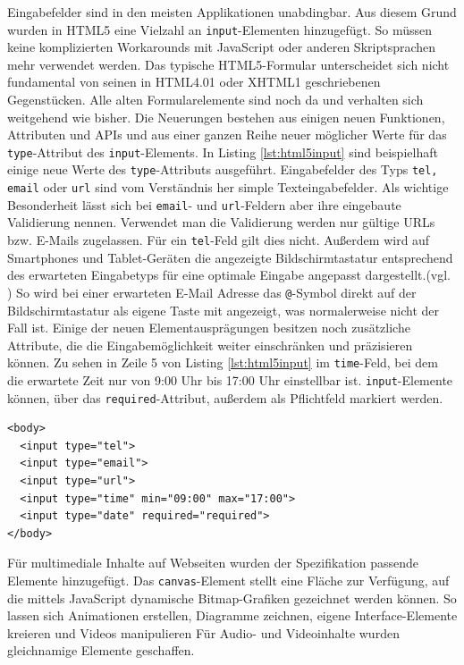Eingabefelder sind in den meisten Applikationen unabdingbar. Aus diesem Grund wurden in HTML5 eine Vielzahl an \texttt{input}-Elementen hinzugefügt. So müssen keine komplizierten Workarounds mit JavaScript oder anderen Skriptsprachen mehr verwendet werden. \glqq Das typische HTML5-Formular unterscheidet sich nicht fundamental von seinen in HTML4.01 oder XHTML1 geschriebenen Gegenstücken. Alle alten Formularelemente sind noch da und verhalten sich weitgehend wie bisher. Die Neuerungen bestehen aus einigen neuen Funktionen, Attributen und APIs und aus einer ganzen Reihe neuer möglicher Werte für das \texttt{type}-Attribut des \texttt{input}-Elements.\grqq{}\cite[S.176]{KronHTML2011} In Listing \ref{lst:html5input} sind beispielhaft einige neue Werte des \texttt{type}-Attributs ausgeführt. Eingabefelder des Typs \texttt{tel, email} oder \texttt{url} sind vom Verständnis her simple Texteingabefelder. Als wichtige Besonderheit lässt sich bei \texttt{email}- und \texttt{url}-Feldern aber ihre eingebaute Validierung nennen. Verwendet man die Validierung werden nur gültige URLs bzw. E-Mails zugelassen. Für ein \texttt{tel}-Feld gilt dies nicht. Außerdem wird auf Smartphones und Tablet-Geräten die angezeigte Bildschirmtastatur entsprechend des erwarteten Eingabetyps für eine optimale Eingabe angepasst dargestellt.(vgl. \cite[S.178]{KronHTML2011}) So wird bei einer erwarteten E-Mail Adresse das \texttt{@}-Symbol direkt auf der Bildschirmtastatur als eigene Taste mit angezeigt, was normalerweise nicht der Fall ist. Einige der neuen Elementausprägungen besitzen noch zusätzliche Attribute, die die Eingabemöglichkeit weiter einschränken und präzisieren können. Zu sehen in Zeile 5 von Listing \ref{lst:html5input} im \texttt{time}-Feld, bei dem die erwartete Zeit nur von 9:00 Uhr bis 17:00 Uhr einstellbar ist. \texttt{input}-Elemente können, über das \texttt{required}-Attribut, außerdem als Pflichtfeld markiert werden.

\vspace{1em}
\begin{lstlisting}[language=HTML5, caption=HTML5 \texttt{input}-Element, label=lst:html5input]
<body>
  <input type="tel">
  <input type="email">
  <input type="url">
  <input type="time" min="09:00" max="17:00">
  <input type="date" required="required">
</body>
\end{lstlisting}
	
Für multimediale Inhalte auf Webseiten wurden der Spezifikation passende Elemente hinzugefügt. Das \texttt{canvas}-Element \glqq [...] stellt eine Fläche zur Verfügung, auf die mittels JavaScript dynamische Bitmap-Grafiken gezeichnet werden können. So lassen sich Animationen erstellen, Diagramme zeichnen, eigene Interface-Elemente kreieren und Videos manipulieren\grqq{}\cite[S.353]{KronHTML2011} Für Audio- und Videoinhalte wurden gleichnamige Elemente geschaffen. 
	

